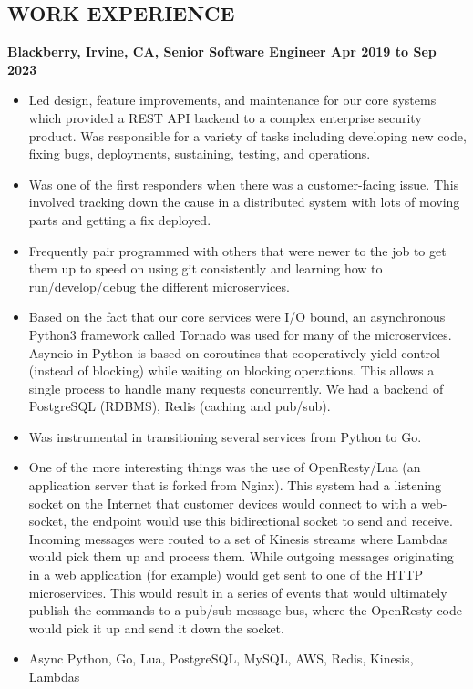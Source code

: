 \documentclass{res}
\begin{document}
\begin{resume}
\section{WORK EXPERIENCE}
  {\large \bf Blackberry, Irvine, CA, Senior Software Engineer \hfill Apr 2019 to Sep 2023}
  \begin{itemize}
  \item
    Led design, feature improvements, and maintenance for our core
    systems which provided a REST API backend to a complex enterprise
    security product.  Was responsible for a variety of tasks including
    developing new code, fixing bugs, deployments, sustaining, testing,
    and operations.
  \item
    Was one of the first responders when there was a customer-facing
    issue.  This involved tracking down the cause in a distributed system
    with lots of moving parts and getting a fix deployed.
  \item
    Frequently pair programmed with others that were newer to the job
    to get them up to speed on using git consistently and learning how
    to run/develop/debug the different microservices.
  \item
    Based on the fact that our core services were I/O bound, an
    asynchronous Python3 framework called Tornado was used for many of
    the microservices. Asyncio in Python is based on coroutines that
    cooperatively yield control (instead of blocking) while waiting on
    blocking operations. This allows a single process to handle many
    requests concurrently.  We had a backend of PostgreSQL (RDBMS),
    Redis (caching and pub/sub).
  \item
    Was instrumental in transitioning several services from Python to Go.
  \item
    One of the more interesting things was the use of OpenResty/Lua (an
    application server that is forked from Nginx).  This system had a
    listening socket on the Internet that customer devices would connect
    to with a web-socket, the endpoint would use this bidirectional
    socket to send and receive.  Incoming messages were routed to a set
    of Kinesis streams where Lambdas would pick them up and process them.
    While outgoing messages originating in a web application (for example)
    would get sent to one of  the HTTP microservices.  This would result
    in a series of events that would ultimately publish the commands
    to a pub/sub message bus, where the OpenResty code would pick it up
    and send it down the socket.
  \item
    Async Python, Go, Lua, PostgreSQL, MySQL, AWS, Redis, Kinesis, Lambdas
  \end{itemize}


\end{resume}
\end{document}
